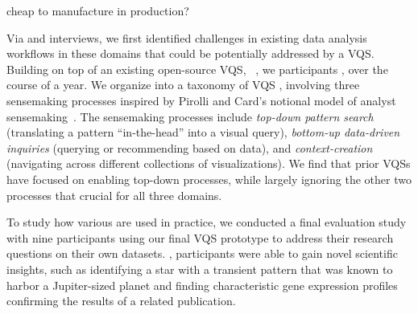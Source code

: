 cheap to manufacture in production?
\par Via  and interviews, we first identified challenges in existing data analysis workflows in these domains
that could be potentially addressed by a VQS. Building on top of an existing open-source VQS, \zv~\cite{Siddiqui2017,Siddiqui2017VLDB}, we  participants , over the course of a year. We organize  into a taxonomy of VQS , involving three sensemaking processes inspired by Pirolli and Card's notional model of analyst sensemaking~\cite{Pirolli}. The sensemaking processes include \emph{top-down pattern search} (translating a pattern ``in-the-head'' into a visual query), \emph{bottom-up data-driven inquiries} (querying or recommending based on data), and \emph{context-creation} (navigating across different collections of visualizations). We find that prior VQSs have focused on enabling top-down processes, while largely ignoring the other two processes that  crucial for all three domains.
\par To study how various  are used in practice,
we conducted a final evaluation study with nine participants
using our final VQS prototype to address their research questions
on their own datasets.
, participants were able to
gain novel scientific insights,
such as identifying a star with a transient pattern
that was known to harbor a Jupiter-sized planet
and finding characteristic gene expression profiles confirming the results of a related publication. 

